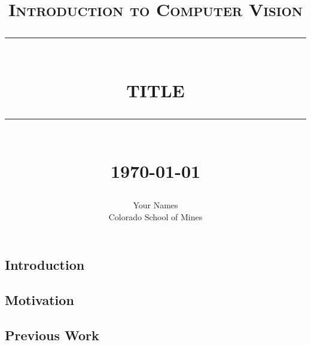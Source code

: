 \documentclass[12pt]{report}
\newcommand{\HRule}[1]{\rule{\linewidth}{#1}}
\begin{document}
\title{ \normalsize \textsc{Introduction to Computer Vision}
		\\ [2.0cm]
		\HRule{0.5pt} \\
		\LARGE \textbf{\uppercase{Title}}
		\HRule{2pt} \\ [0.5cm]
		\normalsize \today \vspace*{5\baselineskip}}

\date{}

\author{
		Your Names \\ 
		Colorado School of Mines \\ }

\maketitle
\newpage

\sectionfont{\scshape}



\subsection*{Introduction}

\subsection*{Motivation}

\subsection*{Previous Work}
\cite{Bauza:2016qr}
\cite{Vachaspati:2013qr}
\cite{StuffMadeHere}
\end{document}
